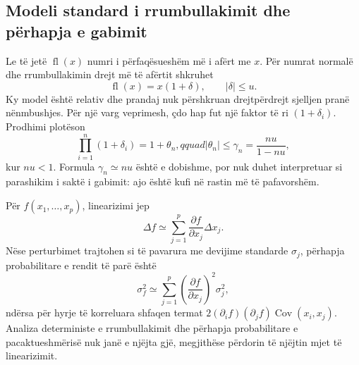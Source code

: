 \subsection{Modeli standard i rrumbullakimit dhe përhapja e gabimit}
Le të jetë $\operatorname{fl}(x)$ numri i përfaqësueshëm më i afërt me $x$. Për numrat normalë dhe rrumbullakimin drejt më të afërtit shkruhet
\begin{equation}
 \operatorname{fl}(x)=x(1+\delta),\qquad |\delta|\le u.
\end{equation}
Ky model është relativ dhe prandaj nuk përshkruan drejtpërdrejt sjelljen pranë nënmbushjes. Për një varg veprimesh, çdo hap fut një faktor të ri $(1+\delta_i)$. Prodhimi plotëson
\begin{equation}
 \prod_{i=1}^{n}(1+\delta_i)=1+\theta_n,qquad
 |\theta_n|\le\gamma_n=\frac{nu}{1-nu},
\end{equation}
kur $nu<1$. Formula $\gamma_n\simeq nu$ është e dobishme, por nuk duhet interpretuar si parashikim i saktë i gabimit: ajo është kufi në rastin më të pafavorshëm.

Për $f(x_1,\ldots,x_p)$, linearizimi jep
\begin{equation}
 \Delta f\simeq\sum_{j=1}^{p}\frac{\partial f}{\partial x_j}\Delta x_j.
\end{equation}
Nëse perturbimet trajtohen si të pavarura me devijime standarde $\sigma_j$, përhapja probabilitare e rendit të parë është
\begin{equation}
 \sigma_f^2\simeq\sum_{j=1}^{p}\left(\frac{\partial f}{\partial x_j}\right)^2\sigma_j^2,
\end{equation}
ndërsa për hyrje të korreluara shfaqen termat $2(\partial_i f)(\partial_j f)\operatorname{Cov}(x_i,x_j)$. Analiza deterministe e rrumbullakimit dhe përhapja probabilitare e pacaktueshmërisë nuk janë e njëjta gjë, megjithëse përdorin të njëjtin mjet të linearizimit.

